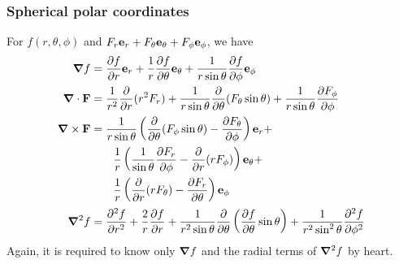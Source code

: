 \documentclass{../../template/note}
\begin{document}
    \subsubsection{Spherical polar coordinates}

    For \(f(r, \theta, \phi)\) and \(F_r \V e_r + F_\theta \V e_\theta + F_\phi \V e_\phi\), we have
    \begin{align*}
        \grad f &= \pd{f}{r} \V e_r + \frac 1 r \pd{f}{\theta} \V e_\theta + \frac 1{r \sin \theta} \pd f \phi \V e_\phi \\
        \div \V F &= \frac 1 {r^2} \pd{} r (r^2F_r) + \frac 1 {r \sin \theta} \pd{}{\theta} (F_\theta \sin \theta) + \frac 1 {r \sin \theta} \pd{F_\phi}{\phi} \\
        \curl \V F &= \frac 1 {r \sin \theta}\left(\pd{} \theta (F_\phi \sin \theta)-\pd{F_\theta}{\phi}\right)\V e_r + \\
        &\qquad \frac 1 r \left(\frac 1 {\sin \theta} \pd{F_r}{\phi} - \pd{} r (rF_\phi)\right)\V e_\theta + \\
        &\qquad \frac 1 r \left(\pd{}r(r F_\theta)-\pd{F_r}{\theta}\right)\V e_\phi \\
        \grad^2 f &= \pd{^2f}{r^2} + \frac 2 r \pd f r + \frac 1 {r^2 \sin \theta} \pd{} \theta \left(\pd f \theta \sin \theta\right) + \frac 1 {r^2 \sin^2 \theta} \pd{^2f}{\phi^2}
    \end{align*}
    Again, it is required to know only \(\grad f\) and the radial terms of \(\grad^2 f\) by heart.
    
\end{document}
